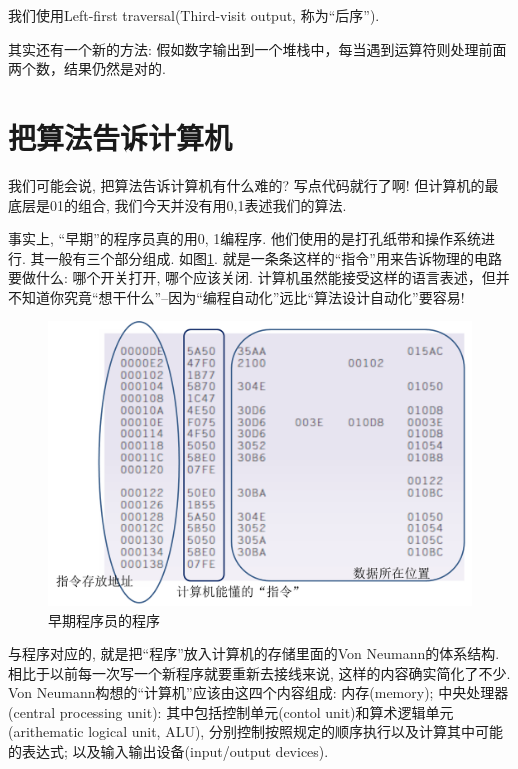 我们使用Left-first traversal(Third-visit output, 称为“后序”). 

其实还有一个新的方法: 假如数字输出到一个堆栈中，每当遇到运算符则处理前面两个数，结果仍然是对的. 


\section{把算法告诉计算机}

我们可能会说, 把算法告诉计算机有什么难的? 写点代码就行了啊! 但计算机的最底层是01的组合, 我们今天并没有用0,1表述我们的算法. 

事实上, “早期”的程序员真的用0, 1编程序. 他们使用的是打孔纸带和操作系统进行. 其一般有三个部分组成. 如图\ref{figs:prog-early}. 就是一条条这样的“指令”用来告诉物理的电路要做什么: 哪个开关打开, 哪个应该关闭. 计算机虽然能接受这样的语言表述，但并不知道你究竟“想干什么”--因为“编程自动化”远比“算法设计自动化”要容易! 

\begin{figure}[h!]
	\centering
	\includegraphics[scale=0.5]{4-programs/figs/prog-early.png}
	\caption{早期程序员的程序}
	\label{figs:prog-early}
	
\end{figure}

与程序对应的, 就是把``程序''放入计算机的存储里面的Von Neumann的体系结构. 相比于以前每一次写一个新程序就要重新去接线来说, 这样的内容确实简化了不少. Von Neumann构想的``计算机''应该由这四个内容组成: 内存(memory); 中央处理器(central processing unit): 其中包括控制单元(contol unit)和算术逻辑单元(arithematic logical unit, ALU), 分别控制按照规定的顺序执行以及计算其中可能的表达式; 以及输入输出设备(input/output devices). 

